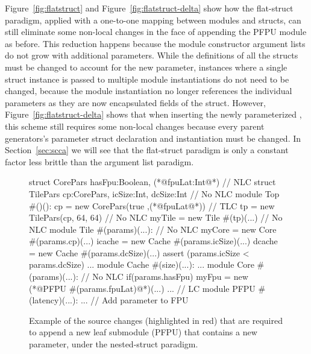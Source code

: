 Figure~\ref{fig:flatstruct} and Figure~\ref{fig:flatstruct-delta} show how the flat-struct paradigm,
applied with a one-to-one mapping between modules and structs,
can still eliminate some non-local changes in the face of appending the PFPU module as before.
This reduction happens because the module constructor argument lists do not grow with additional parameters.
While the definitions of all the structs must be changed to account for the new parameter,
instances where a single struct instance is passed to multiple module instantiations do not need to be changed,
because the module instantiation no longer references the individual parameters as they are now encapsulated fields of the struct.
However, Figure~\ref{fig:flatstruct-delta} shows that when inserting the newly parameterized ,
this scheme still requires some non-local changes because every parent generators's parameter struct declaration and instantiation must be changed.
In Section~\ref{sec:scca} we will see that the flat-struct paradigm is only a constant factor less brittle than the argument list paradigm.

\begin{figure}
\centering
\begin{phdl}
struct CorePars {hasFpu:Boolean, (*@\textcolor[rgb]{1,0,0}{fpuLat:Int}@*)}                     // NLC
struct TilePars {cp:CorePars, icSize:Int, dcSize:Int}            // No NLC
module Top #()():
  cp = new CorePars(true ,(*@\textcolor[rgb]{1,0,0}{fpuLat}@*))                                // TLC
  tp = new TilePars(cp, 64, 64)                                  // No NLC
  myTile = new Tile #(tp)(...)                                   // No NLC
module Tile #(params)(...):                                      // No NLC
  myCore = new Core  #(params.cp)(...)                                                        
  icache = new Cache #(params.icSize)(...)
  dcache = new Cache #(params.dcSize)(...)
  assert (params.icSize < params.dcSize) ...
module Cache #(size)(...): ...
module Core #(params)(...):                                     // No NLC
  if(params.hasFpu) myFpu = new (*@\textcolor[rgb]{1,0,0}{PFPU \#(params.fpuLat)}@*)(...) ...   // LC
module PFPU #(latency)(...): ...     // Add parameter to FPU 
\end{phdl} 
\caption{Example of the source changes (highlighted in red) that are required to append a new leaf submodule (PFPU) that contains a new parameter,
under the nested-struct paradigm.}
\label{fig:nestedstruct-append}
\end{figure}

